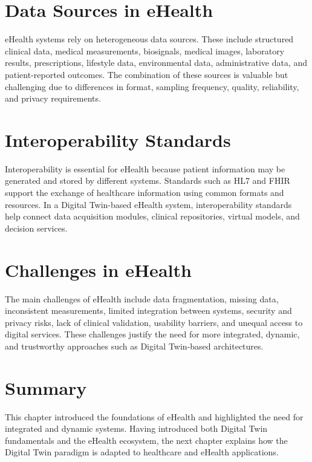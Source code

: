 \section{Data Sources in eHealth}
eHealth systems rely on heterogeneous data sources. These include structured clinical data, medical measurements, biosignals, medical images, laboratory results, prescriptions, lifestyle data, environmental data, administrative data, and patient-reported outcomes. The combination of these sources is valuable but challenging due to differences in format, sampling frequency, quality, reliability, and privacy requirements.

\section{Interoperability Standards}
Interoperability is essential for eHealth because patient information may be generated and stored by different systems. Standards such as HL7 and FHIR support the exchange of healthcare information using common formats and resources. In a Digital Twin-based eHealth system, interoperability standards help connect data acquisition modules, clinical repositories, virtual models, and decision services.

\section{Challenges in eHealth}
The main challenges of eHealth include data fragmentation, missing data, inconsistent measurements, limited integration between systems, security and privacy risks, lack of clinical validation, usability barriers, and unequal access to digital services. These challenges justify the need for more integrated, dynamic, and trustworthy approaches such as Digital Twin-based architectures.

\section{Summary}
This chapter introduced the foundations of eHealth and highlighted the need for integrated and dynamic systems. Having introduced both Digital Twin fundamentals and the eHealth ecosystem, the next chapter explains how the Digital Twin paradigm is adapted to healthcare and eHealth applications.

\clearpage
